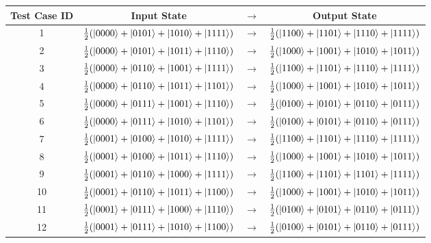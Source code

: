 \begin{figure}
\begin{center}
 \begin{tabular}{c|ccc|} 
 Test Case ID & Input State& $\rightarrow$ & Output State \\  \hline
  1 & $\frac{1}{2}(\ket{0000}+\ket{0101}+\ket{1010}+\ket{1111})$ & $\rightarrow$ & $\frac{1}{2}(\ket{1100}+\ket{1101}+\ket{1110}+\ket{1111})$ \\ %
  2 & $\frac{1}{2}(\ket{0000}+\ket{0101}+\ket{1011}+\ket{1110})$ & $\rightarrow$ & $\frac{1}{2}(\ket{1000}+\ket{1001}+\ket{1010}+\ket{1011})$ \\ %
  3 & $\frac{1}{2}(\ket{0000}+\ket{0110}+\ket{1001}+\ket{1111})$ & $\rightarrow$ & $\frac{1}{2}(\ket{1100}+\ket{1101}+\ket{1110}+\ket{1111})$ \\ %
  4 & $\frac{1}{2}(\ket{0000}+\ket{0110}+\ket{1011}+\ket{1101})$ & $\rightarrow$ & $\frac{1}{2}(\ket{1000}+\ket{1001}+\ket{1010}+\ket{1011})$ \\ %
  5 & $\frac{1}{2}(\ket{0000}+\ket{0111}+\ket{1001}+\ket{1110})$ & $\rightarrow$ & $\frac{1}{2}(\ket{0100}+\ket{0101}+\ket{0110}+\ket{0111})$ \\ %
  6 & $\frac{1}{2}(\ket{0000}+\ket{0111}+\ket{1010}+\ket{1101})$ & $\rightarrow$ & $\frac{1}{2}(\ket{0100}+\ket{0101}+\ket{0110}+\ket{0111})$ \\ \hline
  7 & $\frac{1}{2}(\ket{0001}+\ket{0100}+\ket{1010}+\ket{1111})$ & $\rightarrow$ & $\frac{1}{2}(\ket{1100}+\ket{1101}+\ket{1110}+\ket{1111})$ \\ %
  8 & $\frac{1}{2}(\ket{0001}+\ket{0100}+\ket{1011}+\ket{1110})$ & $\rightarrow$ & $\frac{1}{2}(\ket{1000}+\ket{1001}+\ket{1010}+\ket{1011})$ \\ %
  9 & $\frac{1}{2}(\ket{0001}+\ket{0110}+\ket{1000}+\ket{1111})$ & $\rightarrow$ & $\frac{1}{2}(\ket{1100}+\ket{1101}+\ket{1101}+\ket{1111})$ \\ %
  10 & $\frac{1}{2}(\ket{0001}+\ket{0110}+\ket{1011}+\ket{1100})$ & $\rightarrow$ & $\frac{1}{2}(\ket{1000}+\ket{1001}+\ket{1010}+\ket{1011})$ \\ %
  11 & $\frac{1}{2}(\ket{0001}+\ket{0111}+\ket{1000}+\ket{1110})$ & $\rightarrow$ & $\frac{1}{2}(\ket{0100}+\ket{0101}+\ket{0110}+\ket{0111})$ \\ %
  12 & $\frac{1}{2}(\ket{0001}+\ket{0111}+\ket{1010}+\ket{1100})$ & $\rightarrow$ & $\frac{1}{2}(\ket{0100}+\ket{0101}+\ket{0110}+\ket{0111})$ \\ \hline

\end{tabular}
\end{center}
\end{figure}
